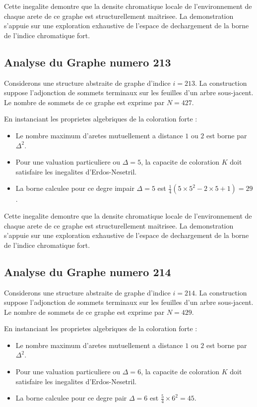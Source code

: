 \documentclass[11pt,a4paper]{article}
\begin{document}
Cette inegalite demontre que la densite chromatique locale de l'environnement de chaque arete de ce graphe est structurellement maitrisee. La demonstration s'appuie sur une exploration exhaustive de l'espace de dechargement de la borne de l'indice chromatique fort.

\subsection{Analyse du Graphe numero 213}
Considerons une structure abstraite de graphe d'indice $i = 213$. La construction suppose l'adjonction de sommets terminaux sur les feuilles d'un arbre sous-jacent. Le nombre de sommets de ce graphe est exprime par $N = 427$.

En instanciant les proprietes algebriques de la coloration forte :
\begin{itemize}
\item Le nombre maximum d'aretes mutuellement a distance $1$ ou $2$ est borne par $\Delta^2$.
\item Pour une valuation particuliere ou $\Delta = 5$, la capacite de coloration $K$ doit satisfaire les inegalites d'Erdos-Nesetril.
\item La borne calculee pour ce degre impair $\Delta = 5$ est $\frac{1}{4}(5 \times 5^2 - 2 \times 5 + 1) = 29$.
\end{itemize}

Cette inegalite demontre que la densite chromatique locale de l'environnement de chaque arete de ce graphe est structurellement maitrisee. La demonstration s'appuie sur une exploration exhaustive de l'espace de dechargement de la borne de l'indice chromatique fort.

\subsection{Analyse du Graphe numero 214}
Considerons une structure abstraite de graphe d'indice $i = 214$. La construction suppose l'adjonction de sommets terminaux sur les feuilles d'un arbre sous-jacent. Le nombre de sommets de ce graphe est exprime par $N = 429$.

En instanciant les proprietes algebriques de la coloration forte :
\begin{itemize}
\item Le nombre maximum d'aretes mutuellement a distance $1$ ou $2$ est borne par $\Delta^2$.
\item Pour une valuation particuliere ou $\Delta = 6$, la capacite de coloration $K$ doit satisfaire les inegalites d'Erdos-Nesetril.
\item La borne calculee pour ce degre pair $\Delta = 6$ est $\frac{5}{4} \times 6^2 = 45$.
\end{itemize}
\end{document}
